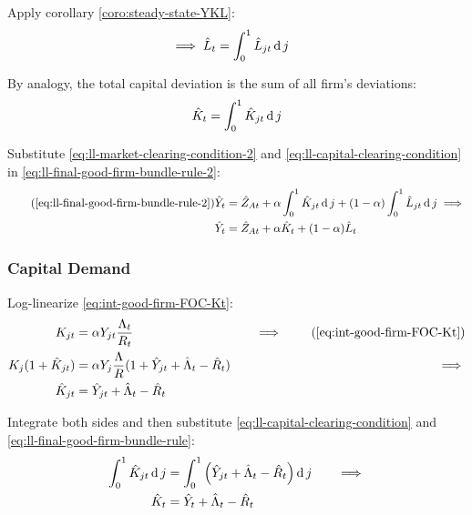 \documentclass[
	thesis.tex
	]{subfiles}
\begin{document}
Apply corollary \ref{coro:steady-state-YKL}:
\begin{align}
	\implies \hat{L}_t &= \int_{0}^{1} \hat{L}_{jt} \operatorname{d} j \label{eq:ll-market-clearing-condition-2}
\end{align}

By analogy, the total capital deviation is the sum of all firm's deviations:
\begin{align}
	\hat{K}_t = \int_{0}^{1} \hat{K}_{jt} \operatorname{d} j \label{eq:ll-capital-clearing-condition}
\end{align}

Substitute \ref{eq:ll-market-clearing-condition-2} and \ref{eq:ll-capital-clearing-condition} in \ref{eq:ll-final-good-firm-bundle-rule-2}:
\begin{align}
	\tag{\ref{eq:ll-final-good-firm-bundle-rule-2}}
	\hat{Y}_t &= \hat{Z}_{At} + \alpha \int_{0}^{1} \hat{K}_{jt} \dif j + (1-\alpha) \int_{0}^{1} \hat{L}_{jt} \dif j \implies \\
	\hat{Y}_t &= \hat{Z}_{At} + \alpha \hat{K}_t + (1-\alpha) \hat{L}_t \label{eq:ll-final-good-firm-bundle-rule-3}
\end{align}


\subsubsection{Capital Demand}

Log-linearize \ref{eq:int-good-firm-FOC-Kt}:
\begin{alignat}{2}
	K_{jt} &= \alpha Y_{jt} \frac{\Lambda_t}{R_t} &\implies \tag{\ref{eq:int-good-firm-FOC-Kt}} \\
	K_j (1+ \hat{K}_{jt}) &= \alpha Y_{j} \frac{\Lambda}{R} (1+ \hat{Y}_{jt} + \hat{\Lambda}_t - \hat{R}_t) \quad &\implies \nonumber \\
	\hat{K}_{jt} &= \hat{Y}_{jt} + \hat{\Lambda}_t - \hat{R}_t \nonumber
\end{alignat}

Integrate both sides and then substitute \ref{eq:ll-capital-clearing-condition} and \ref{eq:ll-final-good-firm-bundle-rule}:
\begin{alignat}{2}
	\int_{0}^{1} \hat{K}_{jt} \operatorname{d} j &= \int_{0}^{1} \left( \hat{Y}_{jt} + \hat{\Lambda}_t - \hat{R}_t \right) \operatorname{d} j \quad &\implies \nonumber \\
	\hat{K}_t &= \hat{Y}_t + \hat{\Lambda}_t - \hat{R}_t \label{eq:ll-int-good-firm-FOC-Kt}
\end{alignat}
\end{document}
